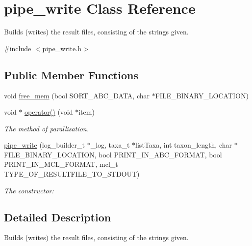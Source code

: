 \hypertarget{classpipe__write}{
\section{pipe\_\-write Class Reference}
\label{classpipe__write}
}


Builds (writes) the result files, consisting of the strings given.  




{\ttfamily \#include $<$pipe\_\-write.h$>$}

\subsection*{Public Member Functions}
\begin{DoxyCompactItemize}
\item 
void \hyperlink{classpipe__write_a0e12bb304c1a503ecc7a28d7b14ad8c6}{free\_\-mem} (bool SORT\_\-ABC\_\-DATA, char $\ast$FILE\_\-BINARY\_\-LOCATION)
\item 
\hypertarget{classpipe__write_ab5eb33c39cb51647722d7be9c9beff8f}{
void $\ast$ \hyperlink{classpipe__write_ab5eb33c39cb51647722d7be9c9beff8f}{operator()} (void $\ast$item)}
\label{classpipe__write_ab5eb33c39cb51647722d7be9c9beff8f}

\begin{DoxyCompactList}\small\item\em The method of parallisation. \end{DoxyCompactList}\item 
\hypertarget{classpipe__write_abea492bfa0f62e8aa6dc935a4d9772b4}{
\hyperlink{classpipe__write_abea492bfa0f62e8aa6dc935a4d9772b4}{pipe\_\-write} (log\_\-builder\_\-t $\ast$\_\-log, taxa\_\-t $\ast$listTaxa, int taxon\_\-length, char $\ast$FILE\_\-BINARY\_\-LOCATION, bool PRINT\_\-IN\_\-ABC\_\-FORMAT, bool PRINT\_\-IN\_\-MCL\_\-FORMAT, mcl\_\-t TYPE\_\-OF\_\-RESULTFILE\_\-TO\_\-STDOUT)}
\label{classpipe__write_abea492bfa0f62e8aa6dc935a4d9772b4}

\begin{DoxyCompactList}\small\item\em The constructor: \end{DoxyCompactList}\end{DoxyCompactItemize}


\subsection{Detailed Description}
Builds (writes) the result files, consisting of the strings given. 

